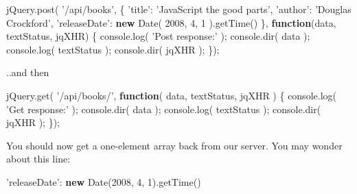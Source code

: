 \documentclass[9pt]{book}
\newenvironment{Shaded}{}{}
\newcommand{\KeywordTok}[1]{\textcolor[rgb]{0.00,0.44,0.13}{\textbf{{#1}}}}
\newcommand{\DecValTok}[1]{\textcolor[rgb]{0.25,0.63,0.44}{{#1}}}
\newcommand{\StringTok}[1]{\textcolor[rgb]{0.25,0.44,0.63}{{#1}}}
\newcommand{\OtherTok}[1]{\textcolor[rgb]{0.00,0.44,0.13}{{#1}}}
\newcommand{\FunctionTok}[1]{\textcolor[rgb]{0.02,0.16,0.49}{{#1}}}
\newcommand{\NormalTok}[1]{{#1}}
\begin{document}
\begin{Shaded}
\begin{Highlighting}[]
\OtherTok{jQuery}\NormalTok{.}\FunctionTok{post}\NormalTok{( }\StringTok{'/api/books'}\NormalTok{, \{}
    \StringTok{'title'}\NormalTok{: }\StringTok{'JavaScript the good parts'}\NormalTok{,}
    \StringTok{'author'}\NormalTok{: }\StringTok{'Douglas Crockford'}\NormalTok{,}
    \StringTok{'releaseDate'}\NormalTok{: }\KeywordTok{new} \FunctionTok{Date}\NormalTok{( }\DecValTok{2008}\NormalTok{, }\DecValTok{4}\NormalTok{, }\DecValTok{1} \NormalTok{).}\FunctionTok{getTime}\NormalTok{()}
\NormalTok{\}, }\KeywordTok{function}\NormalTok{(data, textStatus, jqXHR) \{}
    \OtherTok{console}\NormalTok{.}\FunctionTok{log}\NormalTok{( }\StringTok{'Post response:'} \NormalTok{);}
    \OtherTok{console}\NormalTok{.}\FunctionTok{dir}\NormalTok{( data );}
    \OtherTok{console}\NormalTok{.}\FunctionTok{log}\NormalTok{( textStatus );}
    \OtherTok{console}\NormalTok{.}\FunctionTok{dir}\NormalTok{( jqXHR );}
\NormalTok{\});}
\end{Highlighting}
\end{Shaded}

..and then

\begin{Shaded}
\begin{Highlighting}[]
\OtherTok{jQuery}\NormalTok{.}\FunctionTok{get}\NormalTok{( }\StringTok{'/api/books/'}\NormalTok{, }\KeywordTok{function}\NormalTok{( data, textStatus, jqXHR ) \{}
    \OtherTok{console}\NormalTok{.}\FunctionTok{log}\NormalTok{( }\StringTok{'Get response:'} \NormalTok{);}
    \OtherTok{console}\NormalTok{.}\FunctionTok{dir}\NormalTok{( data );}
    \OtherTok{console}\NormalTok{.}\FunctionTok{log}\NormalTok{( textStatus );}
    \OtherTok{console}\NormalTok{.}\FunctionTok{dir}\NormalTok{( jqXHR );}
\NormalTok{\});}
\end{Highlighting}
\end{Shaded}

You should now get a one-element array back from our server. You may
wonder about this line:

\begin{Shaded}
\begin{Highlighting}[]
\StringTok{'releaseDate'}\NormalTok{: }\KeywordTok{new} \FunctionTok{Date}\NormalTok{(}\DecValTok{2008}\NormalTok{, }\DecValTok{4}\NormalTok{, }\DecValTok{1}\NormalTok{).}\FunctionTok{getTime}\NormalTok{()}
\end{Highlighting}
\end{Shaded}
\end{document}
